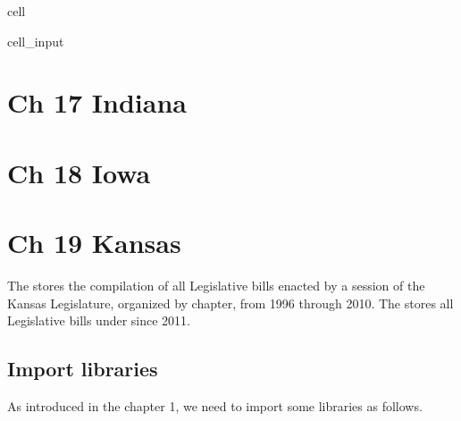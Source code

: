 \documentclass[letterpaper,10pt,english]{jupyterBook}
\begin{document}
\begin{sphinxuseclass}{cell}
\begin{sphinxVerbatimInput}
\begin{sphinxuseclass}{cell_input}
\begin{sphinxVerbatim}[commandchars=\\\{\}]
\end{sphinxVerbatim}

\end{sphinxuseclass}\end{sphinxVerbatimInput}

\end{sphinxuseclass}
\sphinxstepscope


\chapter{Ch 17 Indiana}
\label{\detokenize{ch17:ch-17-indiana}}\label{\detokenize{ch17::doc}}
\sphinxstepscope


\chapter{Ch 18 Iowa}
\label{\detokenize{ch18:ch-18-iowa}}\label{\detokenize{ch18::doc}}
\sphinxstepscope


\chapter{Ch 19 Kansas}
\label{\detokenize{ch19:ch-19-kansas}}\label{\detokenize{ch19::doc}}
\sphinxAtStartPar
The  stores the compilation of all Legislative bills enacted by a session of the Kansas Legislature, organized by chapter, from 1996 through 2010. The  stores all Legislative bills under  since 2011.

\sphinxAtStartPar
{}


\section{Import libraries}
\label{\detokenize{ch19:import-libraries}}
\sphinxAtStartPar
As introduced in the chapter 1, we need to import some libraries as follows.
\end{document}
